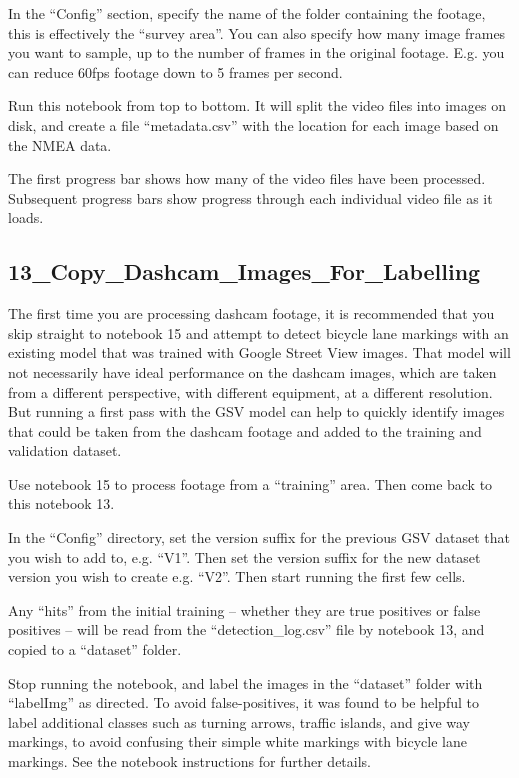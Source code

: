 \documentclass[11pt,twoside]{report}
\begin{document}
In the ``Config'' section, specify the name of the folder containing the footage, this is effectively the ``survey area''.  You can also specify how many image frames you want to sample, up to the number of frames in the original footage.  E.g. you can reduce 60fps footage down to 5 frames per second.

Run this notebook from top to bottom.  It will split the video files into images on disk, and create a file ``metadata.csv'' with the location for each image based on the NMEA data.

The first progress bar shows how many of the video files have been processed.  Subsequent progress bars show progress through each individual video file as it loads.


\subsection{13\_Copy\_Dashcam\_Images\_For\_Labelling}
\label{a13}

The first time you are processing dashcam footage, it is recommended that you skip straight to notebook 15 and attempt to detect bicycle lane markings with an existing model that was trained with Google Street View images.  That model will not necessarily have ideal performance on the dashcam images, which are taken from a different perspective, with different equipment, at a different resolution.  But running a first pass with the GSV model can help to quickly identify images that could be taken from the dashcam footage and added to the training and validation dataset.

Use notebook 15 to process footage from a ``training'' area.  Then come back to this notebook 13.

In the ``Config'' directory, set the version suffix for the previous GSV dataset that you wish to add to, e.g. ``V1''.  Then set the version suffix for the new dataset version you wish to create e.g. ``V2''.  Then start running the first few cells.

Any ``hits'' from the initial training -- whether they are true positives or false positives -- will be read from the ``detection\_log.csv'' file by notebook 13, and copied to a ``dataset'' folder.

Stop running the notebook, and label the images in the ``dataset'' folder with ``labelImg'' as directed.  To avoid false-positives, it was found to be helpful to label additional classes such as turning arrows, traffic islands, and give way markings, to avoid confusing their simple white markings with bicycle lane markings.  See the notebook instructions for further details.
\end{document}
